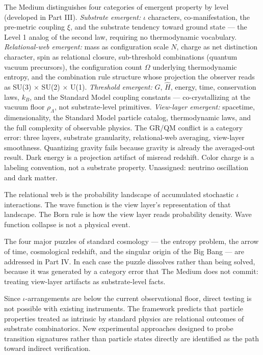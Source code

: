 \documentclass[11pt,letterpaper]{article}
\begin{document}
The Medium distinguishes four categories of emergent property by level (developed in Part III). \emph{Substrate emergent:} \(\iota\) characters, co-manifestation, the pre-metric coupling \(\xi\), and the substrate tendency toward ground state --- the Level 1 analog of the second law, requiring no thermodynamic vocabulary. \emph{Relational-web emergent:} mass as configuration scale \(N\), charge as net distinction character, spin as relational closure, sub-threshold combinations (quantum vacuum precursors), the configuration count \(\Omega\) underlying thermodynamic entropy, and the combination rule structure whose projection the observer reads as SU(3) \(\times\) SU(2) \(\times\) U(1). \emph{Threshold emergent:} \(G\), \(\hat{H}\), energy, time, conservation laws, \(k_B\), and the Standard Model coupling constants --- co-crystallizing at the vacuum floor \(\rho_\Lambda\), not substrate-level primitives. \emph{View-layer emergent:} spacetime, dimensionality, the Standard Model particle catalog, thermodynamic laws, and the full complexity of observable physics. The GR/QM conflict is a category error: three layers, substrate granularity, relational-web averaging, view-layer smoothness. Quantizing gravity fails because gravity is already the averaged-out result. Dark energy is a projection artifact of misread redshift. Color charge is a labeling convention, not a substrate property. Unassigned: neutrino oscillation and dark matter.

The relational web is the probability landscape of accumulated stochastic \(\iota\) interactions. The wave function is the view layer's representation of that landscape. The Born rule is how the view layer reads probability density. Wave function collapse is not a physical event.

The four major puzzles of standard cosmology --- the entropy problem, the arrow of time, cosmological redshift, and the singular origin of the Big Bang --- are addressed in Part IV. In each case the puzzle dissolves rather than being solved, because it was generated by a category error that The Medium does not commit: treating view-layer artifacts as substrate-level facts.

Since \(\iota\)-arrangements are below the current observational floor, direct testing is not possible with existing instruments. The framework predicts that particle properties treated as intrinsic by standard physics are relational outcomes of substrate combinatorics. New experimental approaches designed to probe transition signatures rather than particle states directly are identified as the path toward indirect verification.
\end{document}
